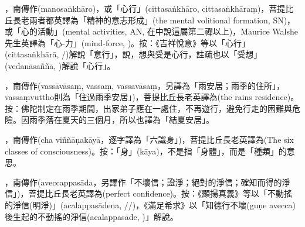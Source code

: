 \startitemgroup[noteitems]
\item{}，南傳作(manosaṅkhāro)，或「心行」(cittasaṅkhāro, cittasaṅkhāraṃ)，菩提比丘長老兩者都英譯為「精神的意志形成」(the mental volitional formation, SN)，或「心的活動」(mental activities, AN, 在中說這屬第二禪以上)，Maurice Walshe先生英譯為「心-力」(mind-force, )。按：《吉祥悅意》等以「心行」(cittasaṅkhārā, /)解說「意行」，說，想與受是心行，註疏也以「受想」(vedanāsaññā, )解說「心行」。
\stopitemgroup

\startitemgroup[noteitems]
\item{}，南傳作(vassāvāsaṃ, vassaṃ, vassavāsaṃ，另譯為「雨安居；雨季的住所」，vassaṃvuttho則為「住過雨季安居」)，菩提比丘長老英譯為(the rains residence)。按：佛陀制定在雨季期間，出家弟子應在一處住，不再遊行，避免行走的困難與危險。因雨季落在夏天的三個月，所以也譯為「結夏安居」。
\stopitemgroup

\startitemgroup[noteitems]
\item{}，南傳作(cha viññāṇakāyā，逐字譯為「六識身」)，菩提比丘長老英譯為(The six classes of consciousness)。按：「身」(kāya)，不是指「身體」，而是「種類」的意思。
\stopitemgroup

\startitemgroup[noteitems]
\item{}，南傳作(aveccappasāda，另譯作「不壞信；證淨；絕對的淨信；確知而得的淨信」)，菩提比丘長老英譯為(perfect confidence)。按：《顯揚真義》等以「不動搖的淨信(明淨)」(acalappasādena, //)，《滿足希求》以「知德行不壞(guṇe avecca)後生起的不動搖的淨信(acalappasāde, )」解說。
\stopitemgroup

